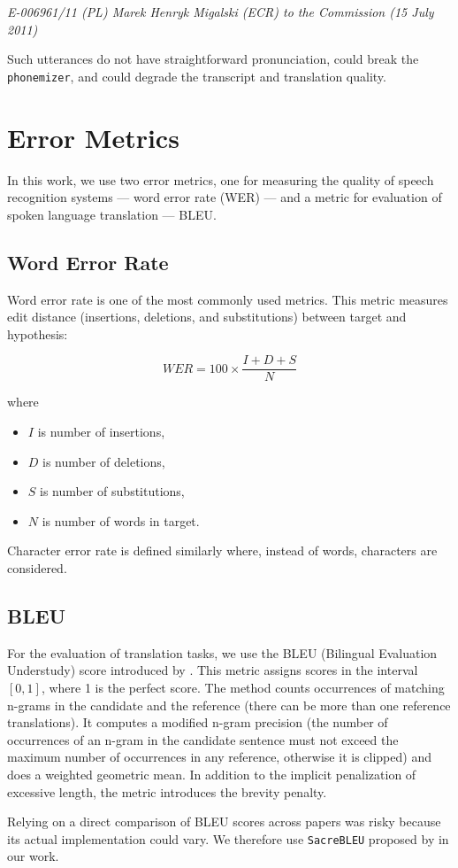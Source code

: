 \begin{minipage}{0.95\linewidth}
	\small\emph{E-006961/11 (PL) Marek Henryk Migalski (ECR) to the Commission (15 July 2011)}\\
\end{minipage}


Such utterances do not have straightforward pronunciation, could break the \texttt{phone\-mi\-zer}, and could degrade the transcript and translation quality.



\pagebreak
\section{Error Metrics}
In this work, we use two error metrics, one for measuring the quality of speech recognition systems --- word error rate (WER) --- and a metric for evaluation of spoken language translation --- BLEU.

\subsection{Word Error Rate}
Word error rate is one of the most commonly used metrics. This metric measures edit distance (insertions, deletions, and substitutions) between target and hypothesis:

\begin{equation}
WER = 100 \times \frac{I + D + S}{N}
\end{equation}

where

\begin{itemize}
	\item $I$ is number of insertions,
	\item $D$ is number of deletions,
	\item $S$ is number of substitutions,
	\item $N$ is number of words in target.
\end{itemize}

Character error rate is defined similarly where, instead of words, characters are considered.

\subsection{BLEU}
For the evaluation of translation tasks, we use the BLEU (Bilingual Evaluation Understudy) score introduced by . This metric assigns scores in the interval $[0,1]$, where 1 is the perfect score. The method counts occurrences of matching n-grams in the candidate and the reference (there can be more than one reference translations). It computes a modified n-gram precision (the number of occurrences of an n-gram in the candidate sentence must not exceed the maximum number of occurrences in any reference, otherwise it is clipped) and does a weighted geometric mean. In addition to the implicit penalization of excessive length, the metric introduces the brevity penalty.

Relying on a direct comparison of BLEU scores across papers was risky because its actual implementation could vary. We therefore use \texttt{SacreBLEU} proposed by  in our work.